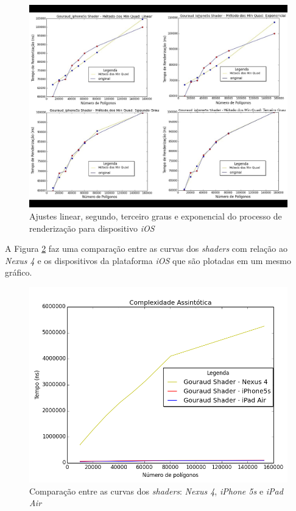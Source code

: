 	\begin{figure}[ht]
	\centering
		\includegraphics[keepaspectratio=true,scale=0.35]{figuras/ios_minquad_render_pt.jpg}
	\caption{Ajustes linear, segundo, terceiro graus e exponencial do processo de renderização para dispositivo \textit{iOS}}
	\label{ios1_ajuste}
	\end{figure}	

	A Figura \ref{nexus_ios} faz uma comparação entre as curvas dos \textit{shaders} com relação ao \textit{Nexus 4} e os dispositivos da plataforma \textit{iOS} que são plotadas em um mesmo gráfico.	

	\begin{figure}[ht]
	\centering
		\includegraphics[keepaspectratio=true,scale=0.4]{figuras/render_time_devices.png}
	\caption{Comparação entre as curvas dos \textit{shaders}: \textit{Nexus 4}, \textit{iPhone 5s} e \textit{iPad Air}}
	\label{nexus_ios}
	\end{figure}	

